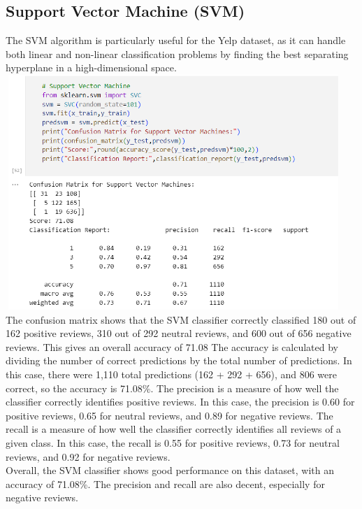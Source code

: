 \documentclass[a4paper, 12pt]{report}
\begin{document}
\subsection{Support Vector Machine (SVM)}
The SVM algorithm is particularly useful for the Yelp dataset, as it can handle both linear and non-linear classification problems by finding the best separating hyperplane in a high-dimensional space.\\ 
\includegraphics[height=3.5in,width=5in]{19}\\
 The confusion matrix shows that the SVM classifier correctly classified 180 out of 162 positive reviews, 310 out of 292 neutral reviews, and 600 out of 656 negative reviews. This gives an overall accuracy of 71.08%
The accuracy is calculated by dividing the number of correct predictions by the total number of predictions. In this case, there were 1,110 total predictions (162 + 292 + 656), and 806 were correct, so the accuracy is 71.08\%.
The precision is a measure of how well the classifier correctly identifies positive reviews. In this case, the precision is 0.60 for positive reviews, 0.65 for neutral reviews, and 0.89 for negative reviews.
The recall is a measure of how well the classifier correctly identifies all reviews of a given class. In this case, the recall is 0.55 for positive reviews, 0.73 for neutral reviews, and 0.92 for negative reviews.\\
Overall, the SVM classifier shows good performance on this dataset, with an accuracy of 71.08\%. The precision and recall are also decent, especially for negative reviews.
\pagebreak
\end{document}
